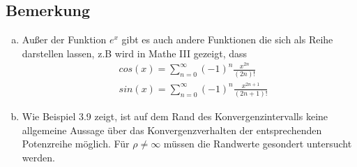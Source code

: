 \documentclass[10pt, a4paper, fleqn]{article}
\begin{document}
    \subsection{Bemerkung}
    \begin{enumerate}[a)]
        \item Außer der Funktion $e^x$ gibt es auch andere Funktionen die sich als Reihe
        darstellen lassen, z.B wird in Mathe III gezeigt, dass
        $$\begin{aligned}
            &cos(x) = \sum_{n=0}^\infty (-1)^n \frac{x^{2n}}{(2n)!} \\
            &sin(x) = \sum_{n=0}^\infty (-1)^n \frac{x^{2n + 1}}{(2n + 1)!}
        \end{aligned}$$

        \item Wie Beispiel 3.9 zeigt, ist auf dem Rand des Konvergenzintervalls keine
        allgemeine Aussage über das Konvergenzverhalten der entsprechenden Potenzreihe möglich.
        Für $\rho \neq \infty$ müssen die Randwerte gesondert untersucht werden.
    \end{enumerate}
\ifdefined\MAINDOC\else
\end{document}
